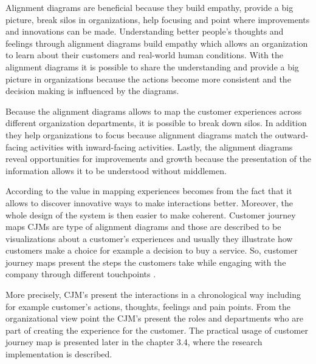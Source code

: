 Alignment diagrams are beneficial because they build empathy, provide a big picture, break silos in organizations, help focusing and point where improvements and innovations can be made. Understanding better people's thoughts and feelings through alignment diagrams build empathy which allows an organization to learn about their customers and real-world human conditions. With the alignment diagrams it is possible to share the understanding and provide a big picture in organizations because the actions become more consistent and the decision making is influenced by the diagrams. \parencite{Kalbach:2016}

Because the alignment diagrams allows to map the customer experiences across different organization departments, it is possible to break down silos. In addition they help organizations to focus because alignment diagrams match the outward-facing activities with inward-facing activities. Lastly, the alignment diagrams reveal opportunities for improvements and growth because the presentation of the information allows it to be understood without middlemen. \parencite{Kalbach:2016}

According to \textcite{Kalbach:2016} the value in mapping experiences becomes from the fact that it allows to discover innovative ways to make interactions better. Moreover, the whole design of the system is then easier to make coherent. Customer journey maps CJMs are type of alignment diagrams and those are described to be visualizations about a customer's experiences and usually they illustrate how customers make a choice for example a decision to buy a service. So, customer journey maps present the steps the customers take while engaging with the company through different touchpoints \parencite{Richardson:2010}.

More precisely, CJM's present the interactions in a chronological way including for example customer's actions, thoughts, feelings and pain points. From the organizational view point the CJM's present the roles and departments who are part of creating the experience for the customer. \parencite{Kalbach:2016} The practical usage of customer journey map is presented later in the chapter 3.4, where the research implementation is described.









